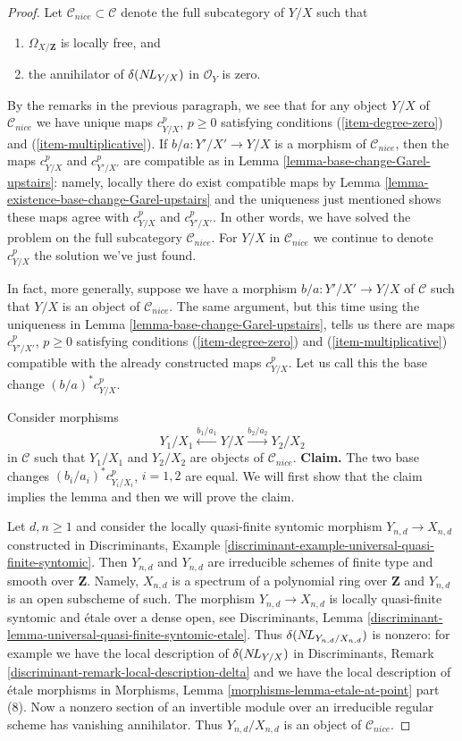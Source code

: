 \begin{proof}
\medskip\noindent
Let $\mathcal{C}_{nice} \subset \mathcal{C}$ denote the full subcategory
of $Y/X$ such that
\begin{enumerate}
\item $\Omega_{X/\mathbf{Z}}$ is locally free, and
\item the annihilator of $\delta(\mathop{N\!L}\nolimits_{Y/X})$ in $\mathcal{O}_Y$ is zero.
\end{enumerate}
By the remarks in the previous paragraph, we see that for any
object $Y/X$ of $\mathcal{C}_{nice}$ we have unique maps
$c^p_{Y/X}$, $p \geq 0$ satisfying conditions (\ref{item-degree-zero})
and (\ref{item-multiplicative}). If $b/a : Y'/X' \to Y/X$
is a morphism of $\mathcal{C}_{nice}$, then the maps
$c^p_{Y/X}$ and $c^p_{Y'/X'}$ are compatible as in
Lemma \ref{lemma-base-change-Garel-upstairs}: namely,
locally there do exist compatible maps by
Lemma \ref{lemma-existence-base-change-Garel-upstairs}
and the uniqueness just mentioned shows these maps agree
with $c^p_{Y/X}$ and $c^p_{Y'/X'}$.
In other words, we have solved the problem
on the full subcategory $\mathcal{C}_{nice}$. For $Y/X$ in $\mathcal{C}_{nice}$
we continue to denote $c^p_{Y/X}$ the solution we've just found.

\medskip\noindent
In fact, more generally, suppose we have a morphism $b/a : Y'/X' \to Y/X$
of $\mathcal{C}$ such that $Y/X$ is an object of $\mathcal{C}_{nice}$.
The same argument, but this time using the uniqueness in
Lemma \ref{lemma-base-change-Garel-upstairs}, tells us there are
maps $c^p_{Y'/X'}$, $p \geq 0$  satisfying conditions (\ref{item-degree-zero})
and (\ref{item-multiplicative}) compatible with the already constructed
maps $c^p_{Y/X}$. Let us call this the base change
$(b/a)^*c^p_{Y/X}$.

\medskip\noindent
Consider morphisms
$$
Y_1/X_1 \xleftarrow{b_1/a_1} Y/X \xrightarrow{b_2/a_2} Y_2/X_2
$$
in $\mathcal{C}$ such that $Y_1/X_1$ and $Y_2/X_2$ are objects
of $\mathcal{C}_{nice}$.
{\bf Claim.} The two base changes $(b_i/a_i)^*c^p_{Y_i/X_i}$, $i = 1, 2$
are equal. We will first show that the claim implies the lemma
and then we will prove the claim.

\medskip\noindent
Let $d, n \geq 1$ and consider the locally
quasi-finite syntomic morphism $Y_{n, d} \to X_{n, d}$
constructed in Discriminants, Example
\ref{discriminant-example-universal-quasi-finite-syntomic}.
Then $Y_{n, d}$ and $Y_{n, d}$ are irreducible schemes of finite type and
smooth over $\mathbf{Z}$. Namely, $X_{n, d}$ is a spectrum of a
polynomial ring over $\mathbf{Z}$ and $Y_{n, d}$ is an open subscheme
of such. The morphism $Y_{n, d} \to X_{n, d}$ is locally quasi-finite syntomic
and \'etale over a dense open, see Discriminants, Lemma
\ref{discriminant-lemma-universal-quasi-finite-syntomic-etale}.
Thus $\delta(\mathop{N\!L}\nolimits_{Y_{n, d}/X_{n, d}})$ is nonzero: for example we have
the local description of $\delta(\mathop{N\!L}\nolimits_{Y/X})$ in
Discriminants, Remark \ref{discriminant-remark-local-description-delta}
and we have the local description of \'etale morphisms in
Morphisms, Lemma \ref{morphisms-lemma-etale-at-point} part (8).
Now a nonzero section of an invertible module over an irreducible
regular scheme has vanishing annihilator. Thus
$Y_{n, d}/X_{n, d}$ is an object of $\mathcal{C}_{nice}$.


\end{proof}
